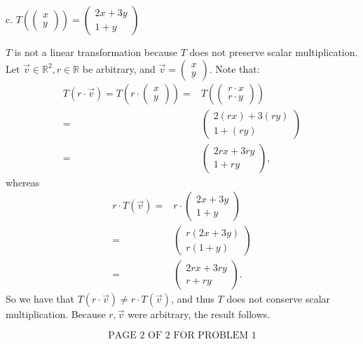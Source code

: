 \documentclass[12pt]{article}
\newenvironment{problem}[2][Problem]
{
	\begin{trivlist} 
		\item[\hskip \labelsep {\bfseries #1 #2:}]
	}
{
	\end{trivlist}
	}
\newenvironment{solution}[1][Solution]
{
	\begin{trivlist} 
		\item[\hskip \labelsep {\itshape #1:}]
	}
	{
	\end{trivlist}
}
\begin{document}
\begin{problem}{5}
\noindent
\newline
\newline
c. $T \left( \begin{pmatrix} x \\ y\end{pmatrix} \right) = \begin{pmatrix} 2x+3y \\ 1+y\end{pmatrix}$
\begin{solution}
$T$ is not a linear transformation because $T$ does not preserve scalar multiplication.  Let $\vec{v} \in \mathbb{R}^2, r \in \mathbb{R}$ be arbitrary, and $\vec{v} = \begin{pmatrix} x \\ y \end{pmatrix}$. Note that:
\begin{align*}
T (r \cdot \vec{v}) = T (r \cdot \begin{pmatrix} x \\ y \end{pmatrix}) =& T (\begin{pmatrix} r \cdot x \\ r \cdot y \end{pmatrix})\\
=& \begin{pmatrix} 2(rx)+3(ry) \\ 1+(ry)\end{pmatrix}\\
=& \begin{pmatrix} 2rx+3ry \\ 1+ry\end{pmatrix} \text{,}
\end{align*}
whereas
\begin{align*}
r \cdot T(\vec{v}) =& r \cdot \begin{pmatrix} 2x+3y \\ 1+y \end{pmatrix}\\
=& \begin{pmatrix} r(2x+3y) \\ r(1+y) \end{pmatrix}\\
=& \begin{pmatrix} 2rx+3ry \\ r+ry \end{pmatrix} \text{.}
\end{align*}
So we have that $T (r \cdot \vec{v}) \neq r\cdot T (\vec{v})$, and thus $T$ does not conserve scalar multiplication. Because $r, \vec{v}$ were arbitrary, the result follows.
\end{solution}
\noindent
\newline
\newline
\newline
\newline
\newline
\newline
\newline
\newline
\newline
\newline
\[
\text{PAGE 2 OF 2 FOR PROBLEM 1}
\]
\end{problem}
\end{document}
